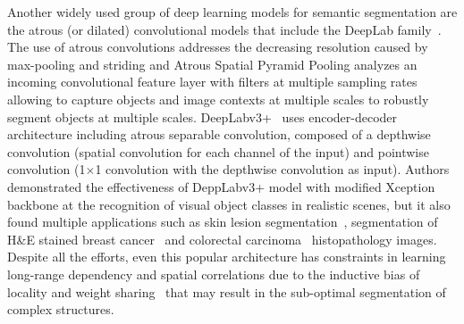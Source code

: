Another widely used group of deep learning models for semantic segmentation are the atrous (or dilated) convolutional models that include the DeepLab family~\cite{chen2017deeplab, chen2017rethinking}. The use of atrous convolutions addresses the decreasing resolution caused by max-pooling and striding and Atrous Spatial Pyramid Pooling analyzes an incoming convolutional feature layer with filters at multiple sampling rates allowing to capture objects and image contexts at multiple scales to robustly segment objects at multiple scales. DeepLabv3+~\cite{chen2018encoder} uses encoder-decoder architecture including atrous separable convolution, composed of a depthwise convolution (spatial convolution for each channel of the input) and pointwise convolution (1$\times$1 convolution with the depthwise convolution as input). Authors~\cite{chen2018encoder} demonstrated the effectiveness of DeppLabv3+ model with modified Xception backbone at the recognition of visual object classes in realistic scenes, but it also found multiple applications such as skin lesion segmentation~\cite{azad2020attention}, segmentation of H\&E stained breast cancer~\cite{priego2020automatic} and colorectal carcinoma~\cite{xu2022spatial} histopathology images. Despite all the efforts, even this popular architecture has constraints in learning long-range dependency and spatial correlations due to the inductive bias of locality and weight sharing~\cite{xie2021cotr} that may result in the sub-optimal segmentation of complex structures. 

